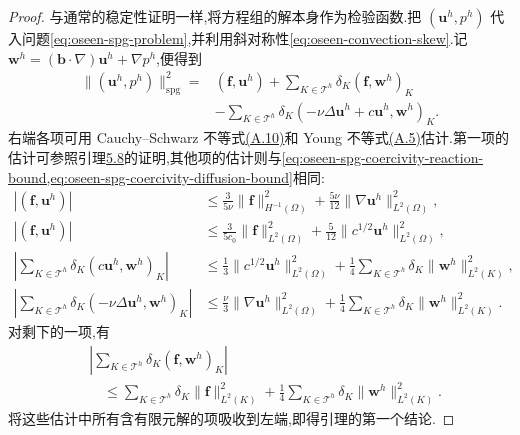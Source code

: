 \begin{proof}
与通常的稳定性证明一样,将方程组的解本身作为检验函数.把 $(\bm{u}^h,p^h)$ 代入问题\cref{eq:oseen-spg-problem},并利用斜对称性\cref{eq:oseen-convection-skew}.记 $\bm{w}^h=(\bm{b}\cdot\nabla)\bm{u}^h+\nabla p^h$,便得到
\begin{equation*}
\begin{aligned}
 \|(\bm{u}^h,p^h)\|_{\mathrm{spg}}^2
  ={}&(\bm{f},\bm{u}^h)
      +\sum_{K\in\mathcal{T}^h}\delta_K
       (\bm{f},\bm{w}^h)_K\\
     &-\sum_{K\in\mathcal{T}^h}\delta_K
       (-\nu\Delta\bm{u}^h+c\bm{u}^h,
          \bm{w}^h)_K.
\end{aligned}
\end{equation*}
右端各项可用 Cauchy--Schwarz 不等式\hyperref[eq:appendix-a-10]{(A.10)}和 Young 不等式\hyperref[eq:appendix-a-5]{(A.5)}估计.第一项的估计可参照引理\hyperref[lem:oseen-fem-stability]{5.8}的证明,其他项的估计则与\cref{eq:oseen-spg-coercivity-reaction-bound,eq:oseen-spg-coercivity-diffusion-bound}相同:
\begin{equation*}
\begin{aligned}
 |(\bm{f},\bm{u}^h)|
   &\le \frac{3}{5\nu}\|\bm{f}\|_{H^{-1}(\Omega)}^2
        +\frac{5\nu}{12}\|\nabla\bm{u}^h\|_{L^2(\Omega)}^2,\\
 |(\bm{f},\bm{u}^h)|
   &\le \frac{3}{5c_0}\|\bm{f}\|_{L^2(\Omega)}^2
        +\frac{5}{12}\|c^{1/2}\bm{u}^h\|_{L^2(\Omega)}^2,\\
 \left|\sum_{K\in\mathcal{T}^h}\delta_K
       (c\bm{u}^h,\bm{w}^h)_K\right|
   &\le \frac{1}{3}\|c^{1/2}\bm{u}^h\|_{L^2(\Omega)}^2
        +\frac{1}{4}\sum_{K\in\mathcal{T}^h}\delta_K
          \|\bm{w}^h\|_{L^2(K)}^2,\\
 \left|\sum_{K\in\mathcal{T}^h}\delta_K
       (-\nu\Delta\bm{u}^h,\bm{w}^h)_K\right|
   &\le \frac{\nu}{3}\|\nabla\bm{u}^h\|_{L^2(\Omega)}^2
        +\frac{1}{4}\sum_{K\in\mathcal{T}^h}\delta_K
          \|\bm{w}^h\|_{L^2(K)}^2.
\end{aligned}
\end{equation*}
对剩下的一项,有
\begin{equation*}
\begin{aligned}
 &\left|\sum_{K\in\mathcal{T}^h}\delta_K
      (\bm{f},\bm{w}^h)_K\right|\\
 &\quad\le \sum_{K\in\mathcal{T}^h}\delta_K
                  \|\bm{f}\|_{L^2(K)}^2
       +\frac{1}{4}\sum_{K\in\mathcal{T}^h}\delta_K
          \|\bm{w}^h\|_{L^2(K)}^2.
\end{aligned}
\end{equation*}
将这些估计中所有含有限元解的项吸收到左端,即得引理的第一个结论.


\end{proof}
